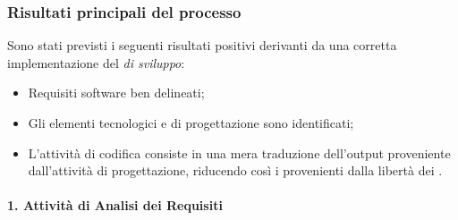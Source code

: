         \subsubsection{Risultati principali del processo}
        Sono stati previsti i seguenti risultati positivi derivanti da una corretta implementazione del \textit{ di sviluppo}:

        \begin{itemize}
          \item Requisiti software ben delineati;
          \item Gli elementi tecnologici e di progettazione sono identificati;
          \item L'attivit\`a di codifica consiste in una mera traduzione dell'output proveniente dall'attivit\`a di progettazione,
            riducendo cos\`i i  provenienti dalla libert\`a dei .
        \end{itemize}
        
		\paragraph*{1. Attività di Analisi dei Requisiti}
